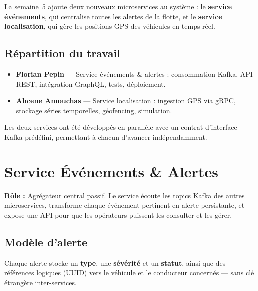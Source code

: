 \documentclass[12pt,a4paper]{article}
\begin{document}
La semaine~5 ajoute deux nouveaux microservices au syst\`{e}me : le \textbf{service \'{e}v\'{e}nements}, qui centralise toutes les alertes de la flotte, et le \textbf{service localisation}, qui g\`{e}re les positions GPS des v\'{e}hicules en temps r\'{e}el.

\subsection{R\'{e}partition du travail}

\begin{itemize}[leftmargin=*]
  \item \textbf{Florian Pepin} --- Service \'{e}v\'{e}nements \& alertes : consommation Kafka, API REST, int\'{e}gration GraphQL, tests, d\'{e}ploiement.
  \item \textbf{Ahcene Amouchas} --- Service localisation : ingestion GPS via gRPC, stockage s\'{e}ries temporelles, g\'{e}ofencing, simulation.
\end{itemize}

Les deux services ont \'{e}t\'{e} d\'{e}velopp\'{e}s en parall\`{e}le avec un contrat d'interface Kafka pr\'{e}d\'{e}fini, permettant \`{a} chacun d'avancer ind\'{e}pendamment.

\newpage
\section{Service \'{E}v\'{e}nements \& Alertes}

\begin{infobox}
\textbf{R\^{o}le :} Agr\'{e}gateur central passif. Le service \'{e}coute les topics Kafka des autres microservices, transforme chaque \'{e}v\'{e}nement pertinent en alerte persistante, et expose une API pour que les op\'{e}rateurs puissent les consulter et les g\'{e}rer.
\end{infobox}

\subsection{Mod\`{e}le d'alerte}

Chaque alerte stocke un \textbf{type}, une \textbf{s\'{e}v\'{e}rit\'{e}} et un \textbf{statut}, ainsi que des r\'{e}f\'{e}rences logiques (UUID) vers le v\'{e}hicule et le conducteur concern\'{e}s --- sans cl\'{e} \'{e}trang\`{e}re inter-services.
\end{document}

